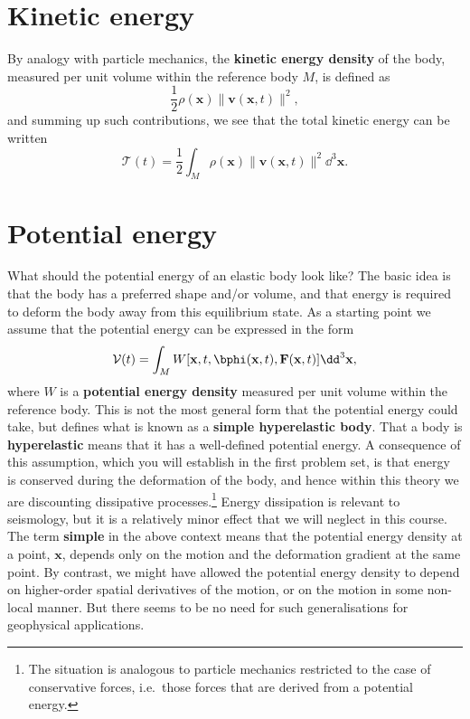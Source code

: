 \section*{Kinetic energy}
By analogy with particle mechanics, the \textbf{kinetic energy density} of the body, measured per unit volume within the reference body $M$, is defined as
\begin{equation}
\frac{1}{2}\rho(\mathbf{x})\|\mathbf{v}(\mathbf{x},t)\|^{2},
\label{eq:14}
\end{equation}
and summing up such contributions, we see that the total kinetic energy can be written
\begin{equation}
\mathcal{T}(t)=\frac{1}{2}\int_{M}\rho(\mathbf{x})\|\mathbf{v}(\mathbf{x},t)\|^{2}\dd^{3}\mathbf{x}.
\label{eq:15}
\end{equation}


\section*{Potential energy}
What should the potential energy of an elastic body look like? The basic idea is that the body has a preferred shape and/or volume, 
and that energy is required to deform the body away from this equilibrium state. As a starting point we assume that the 
potential energy can be expressed in the form
\begin{equation}
\mathcal{V}(t)=\int_{M}W[\mathbf{x},t,\bphi(\mathbf{x},t),\mathbf{F}(\mathbf{x},t)]\dd^{3}\mathbf{x},
\label{eq:16}
\end{equation}
where $W$ is a \textbf{potential energy density} measured per unit volume within the reference body. This is not the most general form 
that the potential energy could take, but defines what is known as a \textbf{simple hyperelastic body}. That a body is 
\textbf{hyperelastic} means that it has a well-defined potential energy. A consequence of this assumption, which you will establish 
in the first problem set, is that energy is conserved during the deformation of the body, and hence within this theory
we are discounting dissipative processes.\footnote{The situation is analogous to particle mechanics restricted to the case of 
conservative forces, i.e.\ those forces that are derived from a potential energy.}
Energy dissipation is relevant to seismology, but it 
is a relatively minor effect that we will neglect in this course. The term \textbf{simple} in the above context means that the 
potential energy density at a point, $\mathbf{x}$, depends only on the motion and the deformation gradient at the same point. 
By contrast, we might have allowed the potential energy density to depend on higher-order spatial derivatives of the motion, 
or on the motion in some non-local manner. But there seems to be no need for such generalisations for geophysical 
applications. 


